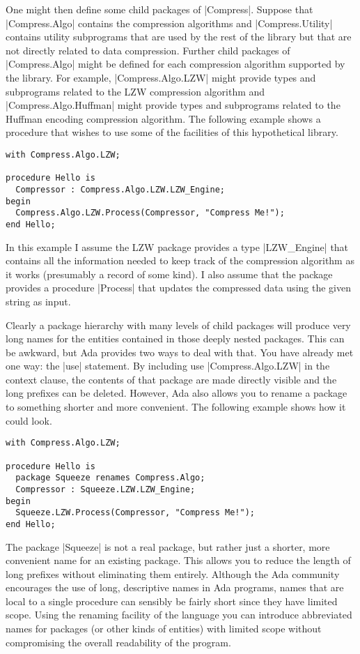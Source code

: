 One might then define some child packages of |Compress|. Suppose that |Compress.Algo| contains
the compression algorithms and |Compress.Utility| contains utility subprograms that are used by
the rest of the library but that are not directly related to data compression. Further child
packages of |Compress.Algo| might be defined for each compression algorithm supported by the
library. For example, |Compress.Algo.LZW| might provide types and subprograms related to the LZW
compression algorithm and |Compress.Algo.Huffman| might provide types and subprograms related to
the Huffman encoding compression algorithm. The following example shows a procedure that wishes
to use some of the facilities of this hypothetical library.

\begin{lstlisting}
with Compress.Algo.LZW;

procedure Hello is
  Compressor : Compress.Algo.LZW.LZW_Engine;
begin
  Compress.Algo.LZW.Process(Compressor, "Compress Me!");
end Hello;
\end{lstlisting}

In this example I assume the LZW package provides a type |LZW_Engine| that contains all the
information needed to keep track of the compression algorithm as it works (presumably a record
of some kind). I also assume that the package provides a procedure |Process| that updates the
compressed data using the given string as input.

Clearly a package hierarchy with many levels of child packages will produce very long names for
the entities contained in those deeply nested packages. This can be awkward, but Ada provides
two ways to deal with that. You have already met one way: the |use| statement. By including use
|Compress.Algo.LZW| in the context clause, the contents of that package are made directly
visible and the long prefixes can be deleted. However, Ada also allows you to rename a package
to something shorter and more convenient. The following example shows how it could look.

\begin{lstlisting}
with Compress.Algo.LZW;

procedure Hello is
  package Squeeze renames Compress.Algo;
  Compressor : Squeeze.LZW.LZW_Engine;
begin
  Squeeze.LZW.Process(Compressor, "Compress Me!");
end Hello;
\end{lstlisting}

The package |Squeeze| is not a real package, but rather just a shorter, more convenient name for
an existing package. This allows you to reduce the length of long prefixes without eliminating
them entirely. Although the Ada community encourages the use of long, descriptive names in Ada
programs, names that are local to a single procedure can sensibly be fairly short since they
have limited scope. Using the renaming facility of the language you can introduce abbreviated
names for packages (or other kinds of entities) with limited scope without compromising the
overall readability of the program.

